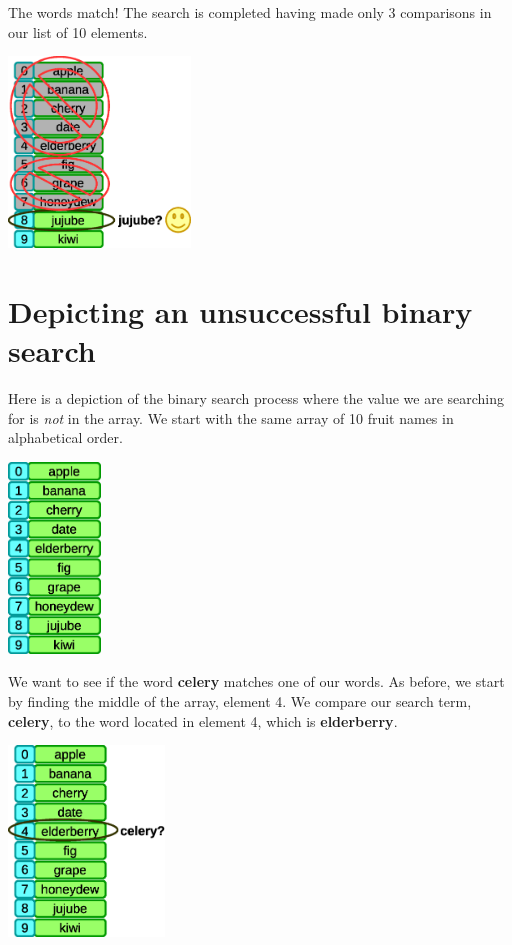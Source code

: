 The words match! The search is completed having made only 3 comparisons in our list of 10 elements.

\beforefig
\centerline{\includegraphics[height=2in]{figs2/recursion-binsearch-success-6.eps}}
\afterfig

\section{Depicting an unsuccessful binary search}

Here is a depiction of the binary search process where the value we are searching for is \textit{not} in the array. We start with the same array of 10 fruit names in alphabetical order. 

\beforefig
\centerline{\includegraphics[height=2in]{figs2/recursion-binsearch-initiallist.eps}}
\afterfig

We want to see if the word \textbf{celery} matches one of our words. As before, we start by finding the middle of the array, element 4. We compare our search term, \textbf{celery}, to the word located in element 4, which is \textbf{elderberry}.

\beforefig
\centerline{\includegraphics[height=2in]{figs2/recursion-binsearch-failure-1.eps}}
\afterfig

